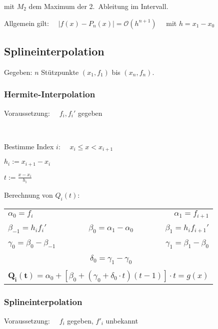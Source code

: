 			mit $M_2$ dem Maximum der 2.~Ableitung im Intervall.

			Allgemein gilt: $\displaystyle\quad |f(x)-P_n(x)|=\mathcal{O}(h^{n+1}) \quad$ mit $h=x_1 - x_0$

	\subsection{Splineinterpolation}
		Gegeben: $n$ Stützpunkte $(x_1,f_1)$ bis $(x_n,f_n)$.

		\subsubsection{Hermite-Interpolation}
			Voraussetzung: $\quad f_i , f_i'$ gegeben

			\begin{algo} ~
				\begin{tightenumerate}
					\item Bestimme Index $i$: $\quad x_i\leq x < x_{i+1}$
					\item $ h_i := x_{i+1}-x_i$
					\item $\displaystyle t := \frac{x-x_i}{h_i}$
					\item Berechnung von $Q_i(t)$:
				\end{tightenumerate}
				\begin{center}
					\begin{tabular}
						{lrlr} \toprule $\alpha_0 = f_i$ & & &$\alpha_1 = f_{i+1}$ \\
						& & & \\
						$\beta_{-1} = h_i f_i' $& \multicolumn{2}{c}{$ \beta_0 = \alpha_1 - \alpha_0$} & $\beta_1 = h_i f_{i+1}'$\\
						& & & \\
						$\gamma_0 = \beta_0 - \beta_{-1}$ & & & $\gamma_1 = \beta_1 - \beta_0$ \\
						& & & \\
						& \multicolumn{2}{c}{$ \delta_0 = \gamma_1 - \gamma_0$}\\
						& & & \\
						\multicolumn{4}{c}{$\mathbf{Q_i(t)} = \alpha_0 + \left[ \beta_0 + (\gamma_0 + \delta_0 \cdot t)(t-1)\right]\cdot t = g(x)$}\\
						\bottomrule
					\end{tabular}
				\end{center}
			\end{algo}

		\subsubsection{Splineinterpolation}
			Voraussetzung: $\quad f_i$ gegeben, $f'_i$ unbekannt

